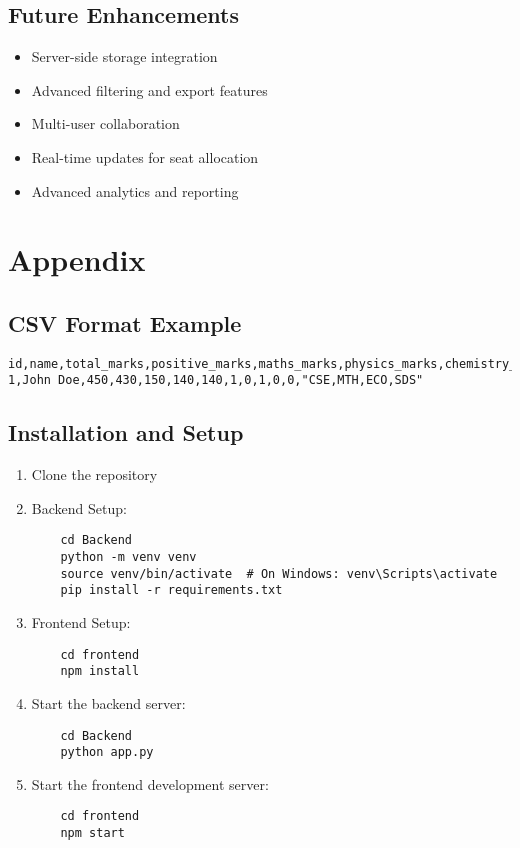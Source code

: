\documentclass[12pt,a4paper]{article}
\begin{document}
\subsection{Future Enhancements}
\begin{itemize}
    \item Server-side storage integration
    \item Advanced filtering and export features
    \item Multi-user collaboration
    \item Real-time updates for seat allocation
    \item Advanced analytics and reporting
\end{itemize}

\section{Appendix}
\subsection{CSV Format Example}
\begin{lstlisting}
id,name,total_marks,positive_marks,maths_marks,physics_marks,chemistry_marks,imotc,ioitc,inpho,incho,inbo,preference_order
1,John Doe,450,430,150,140,140,1,0,1,0,0,"CSE,MTH,ECO,SDS"
\end{lstlisting}

\subsection{Installation and Setup}
\begin{enumerate}
    \item Clone the repository
    \item Backend Setup:
    \begin{lstlisting}
    cd Backend
    python -m venv venv
    source venv/bin/activate  # On Windows: venv\Scripts\activate
    pip install -r requirements.txt
    \end{lstlisting}
    \item Frontend Setup:
    \begin{lstlisting}
    cd frontend
    npm install
    \end{lstlisting}
    \item Start the backend server:
    \begin{lstlisting}
    cd Backend
    python app.py
    \end{lstlisting}
    \item Start the frontend development server:
    \begin{lstlisting}
    cd frontend
    npm start
    \end{lstlisting}
\end{enumerate}
\end{document}

